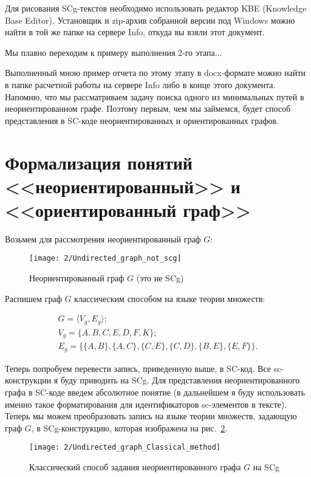 Для рисования SCg-текстов необходимо использовать редактор KBE
(Knowledge Base Editor). Установщик и zip-архив собранной версии под
Windows можно найти в той же папке на сервере Info, откуда вы взяли
этот документ.

Мы плавно переходим к примеру выполнения 2-го этапа$\dots$

Выполненный мною пример отчета по этому этапу в docx-формате можно
найти в папке расчетной работы на сервере Info либо в конце этого
документа.  Напомню, что мы рассматриваем задачу поиска одного из
минимальных путей в неориентированном графе. Поэтому первым, чем мы
займемся, будет способ представления в SC-коде неориентированных и
ориентированных графов.


\section{Формализация понятий <<неориентированный>> и
  <<ориентированный граф>>}
\label{sec:Onto_form_undir_dir_graph}

Возьмем для рассмотрения неориентированный граф $G$:

\begin{figure}[h!]
  \centering
  \texttt{[image: 2/Undirected\_graph\_not\_scg]}
  \caption{Неориентированный граф $G$ (это не SCg)}
  \label{fig:Undirected_graph_not_scg}
\end{figure}

Распишем граф $G$ классическим способом на языке теории множеств:

\begin{gather}
  G = \langle V_g,E_g \rangle; \label{eq:Graph_G_classical} \\
  V_g = \{A,B,C,E,D,F,K\}; \nonumber \\
  E_g = \{\{A,B\},\{A,C\},\{C,E\},\{C,D\},\{B,E\},\{E,F\}\}. \nonumber
\end{gather}

Теперь попробуем перевести запись, приведенную выше, в SC-код. Все
sc-конструкции я буду приводить на SCg. Для представления
неориентированного графа в SC-коде введем абсолютное понятие
 (в дальнейшем я буду использовать именно
такое форматирования для идентификаторов sc-элементов в
тексте). Теперь мы можем преобразовать запись на языке теории
множеств, задающую граф $G$, в SCg-конструкцию, которая изображена на
рис.~\ref{fig:Undirected_graph_Classical_method}.

\begin{figure}[h!]
  \centering
  \texttt{[image: 2/Undirected\_graph\_Classical\_method]}
  \caption{Классический способ задания неориентированного графа $G$ на
    SCg}
  \label{fig:Undirected_graph_Classical_method}
\end{figure}

